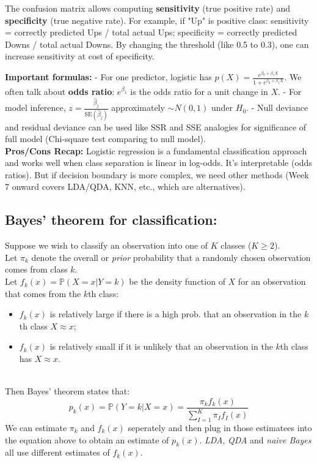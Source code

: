 \documentclass[11pt]{article}
\begin{document}
The confusion matrix allows computing \textbf{sensitivity} (true positive rate) and \textbf{specificity} (true negative rate). For example, if "Up" is positive class: sensitivity = correctly predicted Ups / total actual Ups; specificity = correctly predicted Downs / total actual Downs. By changing the threshold (like 0.5 to 0.3), one can increase sensitivity at cost of specificity.

\textbf{Important formulas:} 
- For one predictor, logistic has $p(X) = \frac{e^{\beta_0+\beta_1 X}}{1+e^{\beta_0+\beta_1 X}}$. We often talk about \textbf{odds ratio}: $e^{\beta_1}$ is the odds ratio for a unit change in $X$. 
- For model inference, $z = \frac{\hat\beta_j}{\text{SE}(\hat\beta_j)}$ approximately $\sim N(0,1)$ under $H_0$.
- Null deviance and residual deviance can be used like SSR and SSE analogies for significance of full model (Chi-square test comparing to null model). \\

\noindent \textbf{Pros/Cons Recap:} Logistic regression is a fundamental classification approach and works well when class separation is linear in log-odds. It's interpretable (odds ratios). But if decision boundary is more complex, we need other methods (Week 7 onward covers LDA/QDA, KNN, etc., which are alternatives). \\

\subsection{Bayes' theorem for classification:}
\noindent Suppose we wish to classify an observation into one of $K$ classes ($K \geq 2$). \\

\noindent Let $\pi_{k}$ denote the overall or \textit{prior} probability that a randomly chosen observation comes from class $k$. \\

\noindent Let $f_k(x) = \mathbb{P}(X=x|Y=k)$ be the density function of $X$ for an observation that comes from the $k$th class:
\begin{itemize}
    \item $f_k(x)$ is relatively large if there is a high prob. that an observation in the $k$th class $X \approx x$;
    \item $f_k(x)$ is relatively small if it is unlikely that an observation in the $k$th class has $X \approx x$.
\end{itemize}
\phantom{i}
\\ \noindent Then Bayes' theorem states that:
$$p_k(x) = \mathbb{P}(Y=k|X=x) = \frac{\pi_k f_k(x)}{\sum_{I=1}^{K}{\pi_I f_I(x)}}$$
\noindent We can estimate $\pi_k$ and $f_k(x)$ seperately and then plug in those estimatees into the equation above to obtain an estimate of $p_k(x)$. \textit{LDA}, \textit{QDA} and \textit{naive Bayes} all use different estimates of $f_k(x)$.
\end{document}
